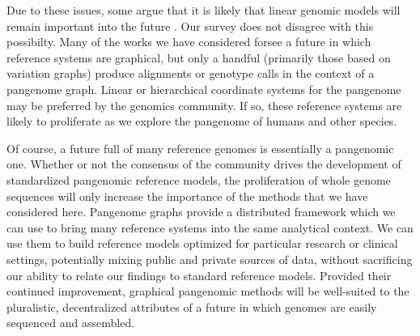 Due to these issues, some argue that it is likely that linear genomic models will remain important into the future \cite{Sherman_2020}.
Our survey does not disagree with this possibilty.
Many of the works we have considered forsee a future in which reference systems are graphical, but only a handful (primarily those based on variation graphs) produce alignments or genotype calls in the context of a pangenome graph.
Linear or hierarchical coordinate systems for the pangenome may be preferred by the genomics community.
If so, these reference systems are likely to proliferate as we explore the pangenome of humans and other species. %

Of course, a future full of many reference genomes is essentially a pangenomic one.
Whether or not the consensus of the community drives the development of standardized pangenomic reference models, the proliferation of whole genome sequences will only increase the importance of the methods that we have considered here.
Pangenome graphs provide a distributed framework which we can use to bring many reference systems into the same analytical context.
We can use them to build reference models optimized for particular research or clinical settings, potentially mixing public and private sources of data, without sacrificing our ability to relate our findings to standard reference models.
Provided their continued improvement, graphical pangenomic methods will be well-suited to the pluralistic, decentralized attributes of a future in which genomes are easily sequenced and assembled.


%





